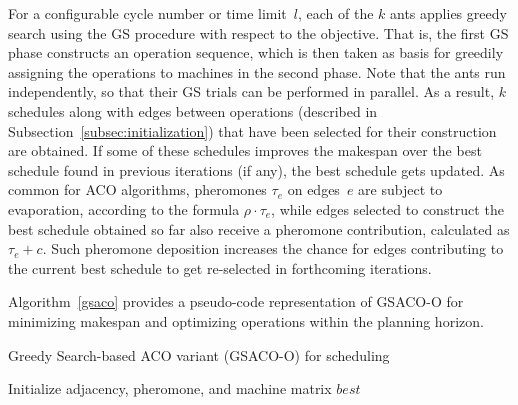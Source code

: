 For a configurable cycle number or time limit~$l$,
each of the $k$ ants applies greedy search
using the GS procedure with respect to the objective.
That is, the first GS phase constructs an operation sequence, which is
then taken as basis for greedily assigning the operations to machines
in the second phase.   
Note that the ants run independently, so that their GS trials
can be performed in parallel.
As a result, $k$ schedules along with edges between operations
(described in Subsection~\ref{subsec:initialization})
that have been selected for their construction are obtained.
If some of these schedules improves the makespan over the best
schedule found in previous iterations (if any),
the best schedule gets updated.
As common for ACO algorithms,
pheromones $\tau_e$ on edges~$e$ are subject to evaporation,
according to the formula $\rho\cdot\tau_e$,
while edges selected to construct the best schedule obtained
so far also receive a pheromone contribution,
calculated as $\tau_e+c$.
Such pheromone deposition increases the chance for edges contributing to the
current best schedule
to get re-selected %
in forthcoming iterations.

Algorithm~\ref{gsaco} provides a pseudo-code representation of
GSACO-O for minimizing makespan and optimizing operations within the planning horizon.

\begin{algorithm}[t]
	\caption{Greedy Search-based ACO variant (GSACO-O) for scheduling}
	\label{gsaco}
	Initialize adjacency, pheromone, and machine matrix\; 
	\Return $\mathit{best}$\;
\end{algorithm}


